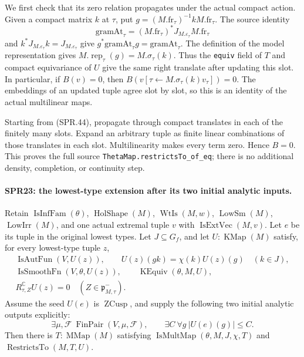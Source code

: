 \documentclass[11pt,a4paper]{article}
\numberwithin{equation}{section}
\theoremstyle{remark}\newtheorem{remark}[theorem]{Remark}
\begin{document}
We first check that its zero relation propagates under the
actual compact action.  Given a compact matrix \(k\) at \(\tau\),
put \(g=(M.\mathrm{fr}_\tau)^{-1}kM.\mathrm{fr}_\tau\).
The source identity
\[
 \mathrm{gramAt}_\tau
   =(M.\mathrm{fr}_\tau)^*J_{M.\varepsilon_\tau}
                         M.\mathrm{fr}_\tau
 \tag{SPR.45}
\]
and \(k^*J_{M.\varepsilon_\tau}k=J_{M.\varepsilon_\tau}\)
give \(g^*\mathrm{gramAt}_\tau g=\mathrm{gramAt}_\tau\).
The definition of the model representation gives
\(M.\operatorname{rep}_\tau(g)=M.\sigma_\tau(k)\).
Thus the \texttt{equiv} field of \(T\) and compact equivariance
of \(U\) give the same right translate after updating this
slot.  In particular, if \(B(v)=0\), then
\(B(v[\tau\leftarrow M.\sigma_\tau(k)v_\tau])=0\).
The embeddings of an updated tuple agree slot by slot, so this
is an identity of the actual multilinear maps.

Starting from (SPR.44), propagate through compact translates
in each of the finitely many slots.  Expand an arbitrary tuple
as finite linear combinations of those translates in each slot.
Multilinearity makes every term zero.  Hence \(B=0\).
This proves the full source \texttt{ThetaMap.\allowbreak restrictsTo\_\allowbreak of\_\allowbreak eq};
there is no additional density, completion, or continuity step.

\paragraph{SPR23: the lowest-type extension after its two initial analytic inputs.}
\label{claim:SPR23}
Retain \(\operatorname{IsInfFam}(\theta)\),
\(\operatorname{HolShape}(M)\), \(\operatorname{WtIs}(M,w)\),
\(\operatorname{LowSm}(M)\), \(\operatorname{LowIrr}(M)\),
and one actual extremal tuple \(v\) with
\(\operatorname{IsExtVec}(M,v)\).
Let \(e\) be its tuple in the original lowest types.
Let \(J\subseteq G_f\), and let \(U:\operatorname{KMap}(M)\)
satisfy, for every lowest-type tuple \(z\),
\[
\begin{gathered}
 \operatorname{IsAutFun}(V,U(z)),\qquad
 U(z)(gk)=\chi(k)U(z)(g)\quad(k\in J),\\
 \operatorname{IsSmoothFn}(V,\theta,U(z)),\qquad
 \operatorname{KEquiv}(\theta,M,U),\\
 R^\mathbb C_{\tau,Z}U(z)=0
                  \quad(Z\in\mathfrak p^-_{M,\tau}).
\end{gathered}
\tag{SPR.46}
\]
Assume the seed \(U(e)\) is \(\operatorname{ZCusp}\), and supply
the following two initial analytic outputs explicitly:
\[
 \exists\mu,\mathcal F\ \operatorname{FinPair}(V,\mu,\mathcal F),
 \qquad \exists C\ \forall g\ |U(e)(g)|\le C.
 \tag{SPR.47}
\]
Then there is \(T:\operatorname{MMap}(M)\) satisfying
\(\operatorname{IsMultMap}(\theta,M,J,\chi,T)\) and
\(\operatorname{RestrictsTo}(M,T,U)\).
\end{document}

